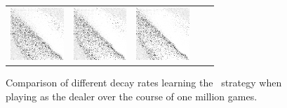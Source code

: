 \begin{figure}[h]
\begin{tabular}{c | l l l l}
			\parbox[c]{5em}{\includegraphics[width=2cm]{images/findings/experiments/decay/decay_050_500.png}} & %
			\parbox[c]{5em}{\includegraphics[width=2cm]{images/findings/experiments/decay/decay_050_750.png}} & %
			\parbox[c]{5em}{\includegraphics[width=2cm]{images/findings/experiments/decay/decay_050_1mm.png}} \\ %
	\end{tabular}

\caption{
	Comparison of different decay rates learning the \handmaxavg\ strategy
	when playing as the dealer
	over the course of one million games.
	}
\label{fig:expts-decay-comp}
\end{figure}
